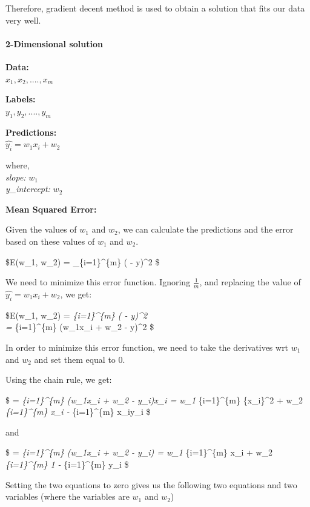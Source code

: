 \documentclass[11pt]{article}
\begin{document}
Therefore, gradient decent method is used to obtain a solution that fits
our data very well.

    \hypertarget{dimensional-solution}{%
\paragraph{2-Dimensional solution}\label{dimensional-solution}}

\textbf{Data:}\\
\(x_1, x_2, ...., x_m\)

\textbf{Labels:}\\
\(y_1, y_2, ...., y_m\)

\textbf{Predictions:}\\
\(\hat{y_i} = w_1x_i + w_2\)

where,\\
\emph{slope:} \(w_1\)\\
\emph{y\_intercept:} \(w_2\)

\textbf{Mean Squared Error:}

Given the values of \(w_1\) and \(w_2\), we can calculate the
predictions and the error based on these values of \(w_1\) and \(w_2\).

\$E(w\_1, w\_2) =  \sum\_\{i=1\}\^{}\{m\} ( - y)\^{}2
\$

We need to minimize this error function. Ignoring \(\frac{1}{m}\), and
replacing the value of \(\hat{y_i} = w_1x_i + w_2\), we get:

\$E(w\_1, w\_2) = \sum\emph{\{i=1\}\^{}\{m\} ( - y)\^{}2\\
= \sum}\{i=1\}\^{}\{m\} (w\_1x\_i + w\_2 - y)\^{}2 \$

In order to minimize this error function, we need to take the
derivatives wrt \(w_1\) and \(w_2\) and set them equal to 0.

Using the chain rule, we get:

\$ = \sum\emph{\{i=1\}\^{}\{m\} (w\_1x\_i
+ w\_2 - y\_i)x\_i = w\_1 \sum}\{i=1\}\^{}\{m\} \{x\_i\}\^{}2 + w\_2
\sum\emph{\{i=1\}\^{}\{m\} x\_i - \sum}\{i=1\}\^{}\{m\} x\_iy\_i \$

and

\$ = \sum\emph{\{i=1\}\^{}\{m\} (w\_1x\_i
+ w\_2 - y\_i) = w\_1 \sum}\{i=1\}\^{}\{m\} x\_i + w\_2
\sum\emph{\{i=1\}\^{}\{m\} 1 - \sum}\{i=1\}\^{}\{m\} y\_i \$

Setting the two equations to zero gives us the following two equations
and two variables (where the variables are \(w_1\) and \(w_2\))
\end{document}
